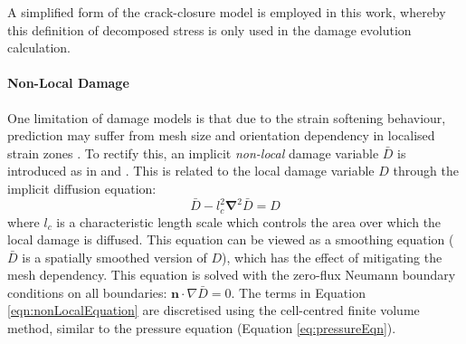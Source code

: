 \documentclass[sn-mathphys,Numbered,draft]{sn-jnl}%
\newcommand{\bb}{\boldsymbol}
\begin{document}
A simplified form of the crack-closure model \cite{teixeira_ductile_2010} is employed in this work, whereby this definition of decomposed stress is only used in the damage evolution calculation. 






\paragraph{Non-Local Damage}


One limitation of damage models is that due to the strain softening behaviour, prediction may suffer from mesh size and orientation dependency in localised strain zones \cite{peerlings_critical_2001, peerlings_localisation_2002, geers_strongly_2003}.
To rectify this, an implicit \emph{non-local} damage variable $\bar{D}$ is introduced as in \citet{peerlings_critical_2001, peerlings_localisation_2002} and \citet{geers_strongly_2003}.
This is related to the local damage variable $D$ through the implicit diffusion equation:
\begin{equation} \label{eqn:nonLocalEquation}
	\bar{D} -  l_c^2 \bb{\nabla}^2 \bar{D} = D
\end{equation}
where $l_c$ is a characteristic length scale which controls the area over which the local damage is diffused.
This equation can be viewed as a smoothing equation ($\bar{D}$ is a spatially smoothed version of $D$), which has the effect of mitigating the mesh dependency. This equation is solved with the zero-flux Neumann boundary conditions on all boundaries:  $\bb{n} \cdot \nabla \bar{D} = 0$.
The terms in Equation \ref{eqn:nonLocalEquation} are discretised using the cell-centred finite volume method, similar to the pressure equation (Equation \ref{eq:pressureEqn}).
\end{document}
